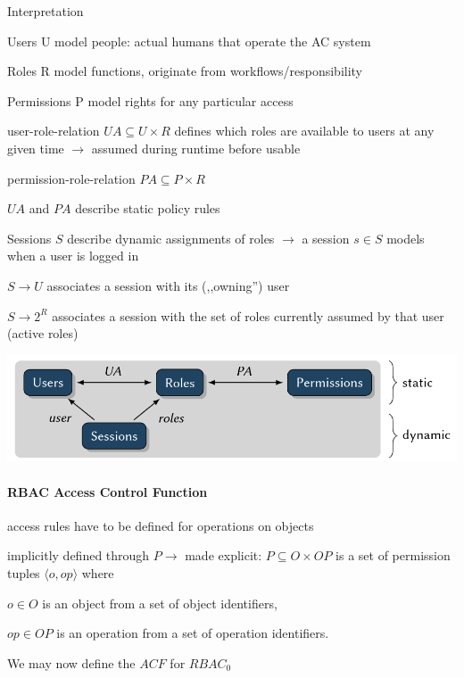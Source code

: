 \documentclass[a4paper]{article}
\begin{document}
\begin{multicols}{3}
    Interpretation
    \begin{itemize*}
        \item Users U model people: actual humans that operate the AC system
        \item Roles R model functions, originate from workflows/responsibility
        \item Permissions P model rights for any particular access
        \item user-role-relation $UA\subseteq U\times R$ defines which roles are available to users at any given time $\rightarrow$ assumed during runtime before usable
        \item permission-role-relation $PA\subseteq P\times R$
        \item $UA$ and $PA$ describe static policy rules
        \item Sessions $S$ describe dynamic assignments of roles $\rightarrow$ a session $s\in S$ models when a user is logged in
        \begin{itemize*}
            \item $S\rightarrow U$ associates a session with its (,,owning'') user
            \item $S\rightarrow 2^R$ associates a session with the set of roles currently assumed by that user (active roles)
        \end{itemize*}
    \end{itemize*}
    \begin{center}
        \includegraphics[width=.5\linewidth]{Assets/Systemsicherheit-rbac-0.png}
    \end{center}

    \paragraph{RBAC Access Control Function}
    \begin{itemize*}
        \item access rules have to be defined for operations on objects
        \item implicitly defined through $P\rightarrow$ made explicit: $P\subseteq O\times OP$ is a set of permission tuples $\langle o,op\rangle$ where
        \begin{itemize*}
            \item $o\in O$ is an object from a set of object identifiers,
            \item $op\in OP$ is an operation from a set of operation identifiers.
        \end{itemize*}
        \item We may now define the $ACF$ for $RBAC_0$
    \end{itemize*}


\end{multicols}
\end{document}

